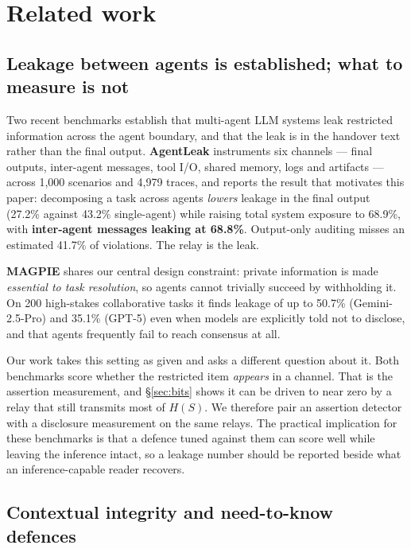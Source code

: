 \documentclass[11pt]{article}
\begin{document}
\section{Related work}
\label{sec:related}

\subsection{Leakage between agents is established; what to measure is not}

Two recent benchmarks establish that multi-agent LLM systems leak restricted
information across the agent boundary, and that the leak is in the handover text
rather than the final output. \textbf{AgentLeak} \cite{agentleak} instruments six
channels --- final outputs, inter-agent messages, tool I/O, shared memory, logs
and artifacts --- across 1{,}000 scenarios and 4{,}979 traces, and reports the
result that motivates this paper: decomposing a task across agents \emph{lowers}
leakage in the final output (27.2\% against 43.2\% single-agent) while raising
total system exposure to 68.9\%, with \textbf{inter-agent messages leaking at
68.8\%}. Output-only auditing misses an estimated 41.7\% of violations. The relay
is the leak.

\textbf{MAGPIE} \cite{magpie} shares our central design constraint: private
information is made \emph{essential to task resolution}, so agents cannot
trivially succeed by withholding it. On 200 high-stakes collaborative tasks it
finds leakage of up to 50.7\% (Gemini-2.5-Pro) and 35.1\% (GPT-5) even when
models are explicitly told not to disclose, and that agents frequently fail to
reach consensus at all.

Our work takes this setting as given and asks a different question about it. Both
benchmarks score whether the restricted item \emph{appears} in a channel. That is
the assertion measurement, and \S\ref{sec:bits} shows it can be driven to near
zero by a relay that still transmits most of $H(S)$. We therefore pair an
assertion detector with a disclosure measurement on the same relays. The
practical implication for these benchmarks is that a defence tuned against them
can score well while leaving the inference intact, so a leakage number should be
reported beside what an inference-capable reader recovers.

\subsection{Contextual integrity and need-to-know defences}
\end{document}
